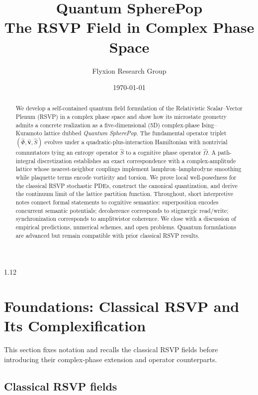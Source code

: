 \documentclass[12pt,a4paper]{article}
\title{\Huge\textbf{Quantum SpherePop}\\[0.35em]
\Large The RSVP Field in Complex Phase Space}
\author{Flyxion Research Group}
\date{\today}
\numberwithin{equation}{section}
\theoremstyle{remark}
\theoremstyle{definition}
\begin{document}
\maketitle
\begin{spacing}{1.12}

\begin{abstract}
We develop a self-contained quantum field formulation of the Relativistic Scalar--Vector Plenum (RSVP) in a complex phase space and show how its microstate geometry admits a concrete realization as a five-dimensional (5D) complex-phase Ising--Kuramoto lattice dubbed \emph{Quantum SpherePop}. The fundamental operator triplet $(\hat{\Phi},\hat{\mathbf{v}},\hat{S})$ evolves under a quadratic-plus-interaction Hamiltonian with nontrivial commutators tying an entropy operator $\hat{S}$ to a cognitive phase operator $\hat{\Omega}$. A path-integral discretization establishes an exact correspondence with a complex-amplitude lattice whose nearest-neighbor couplings implement lamphron--lamphrodyne smoothing while plaquette terms encode vorticity and torsion. We prove local well-posedness for the classical RSVP stochastic PDEs, construct the canonical quantization, and derive the continuum limit of the lattice partition function. Throughout, short interpretive notes connect formal statements to cognitive semantics: superposition encodes concurrent semantic potentials; decoherence corresponds to stigmergic read/write; synchronization corresponds to amplitwistor coherence. We close with a discussion of empirical predictions, numerical schemes, and open problems. Quantum formulations are advanced but remain compatible with prior classical RSVP results.
\end{abstract}

\tableofcontents

\section{Foundations: Classical RSVP and Its Complexification}
\label{sec:foundations}

This section fixes notation and recalls the classical RSVP fields before introducing their complex-phase extension and operator counterparts.

\subsection{Classical RSVP fields}
\label{subsec:classical-rsvp}


\end{spacing}
\end{document}
